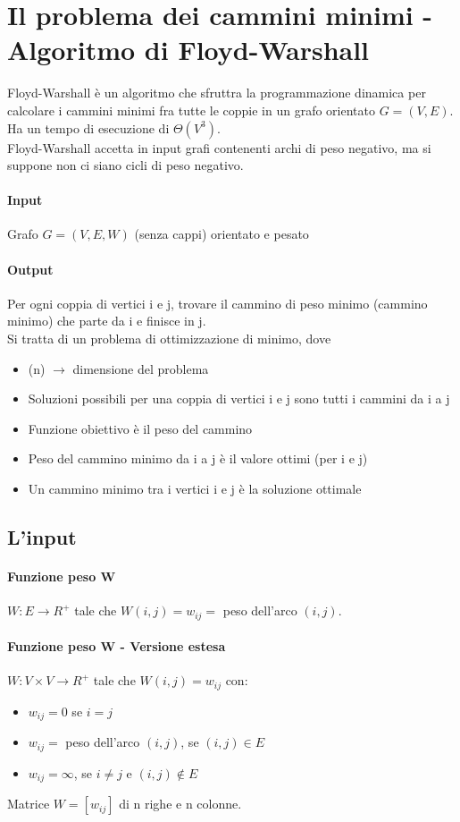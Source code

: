 \section{Il problema dei cammini minimi - Algoritmo di Floyd-Warshall}
Floyd-Warshall è un algoritmo che sfruttra la programmazione dinamica per calcolare i cammini minimi fra tutte le coppie
in un grafo orientato $G = (V,E)$. Ha un tempo di esecuzione di $\Theta(V^3)$.\\
Floyd-Warshall accetta in input grafi contenenti archi di peso negativo, ma si suppone non ci siano cicli di peso negativo.
\paragraph*{Input} Grafo $G=(V,E,W)$ (senza cappi) orientato e pesato
\paragraph*{Output} Per ogni coppia di vertici i e j, trovare il cammino di peso minimo (cammino minimo)
che parte da i e finisce in j.\\
Si tratta di un problema di ottimizzazione di minimo, dove
\begin{itemize}
    \item (n) $\rightarrow$ dimensione del problema
    \item Soluzioni possibili per una coppia di vertici i e j sono tutti i cammini da i a j
    \item Funzione obiettivo è il peso del cammino
    \item Peso del cammino minimo da i a j è il valore ottimi (per i e j)
    \item Un cammino minimo tra i vertici i e j è la soluzione ottimale
\end{itemize}
\subsection{L'input}
\paragraph*{Funzione peso W} $W:E \rightarrow R^+$ tale che $W(i,j) = w_{ij} =$ peso dell'arco $(i,j)$.
\paragraph*{Funzione peso W - Versione estesa} $W:V \times V \rightarrow R^+$ tale che $W(i,j) = w_{ij}$ con:
\begin{itemize}
    \item $w_{ij} = 0$ se $i=j$
    \item $w_{ij} =$ peso dell'arco $(i,j)$, se $(i,j) \in E$
    \item $w_{ij} = \infty$, se $i \neq j$ e $(i,j) \notin E$ 
\end{itemize}
Matrice $W=[w_{ij}]$ di n righe e n colonne.
